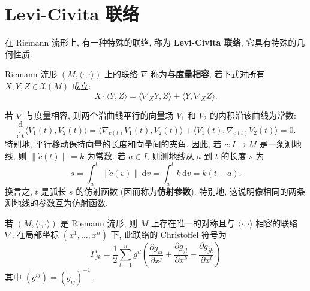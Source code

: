 \section{Levi-Civita 联络}\label{sec:levi-civita-connection}

在 Riemann 流形上, 有一种特殊的联络, 称为 \textbf{Levi-Civita 联络}, 它具有特殊的几何性质.

\begin{RiemannDefinition}\label{def:metric-compatible-connection}
Riemann 流形 $(M,\langle\cdot,\cdot\rangle)$ 上的联络 $\nabla$ 称为\textbf{与度量相容}, 若下式对所有 $X,Y,Z\in\mathfrak{X}(M)$ 成立:
\[
  X\cdot\langle Y,Z\rangle
  =\langle\nabla_XY,Z\rangle+\langle Y,\nabla_XZ\rangle.
\]
\end{RiemannDefinition}

若 $\nabla$ 与度量相容, 则两个沿曲线平行的向量场 $V_1$ 和 $V_2$ 的内积沿该曲线为常数:
\[
  \frac{\mathrm{d}}{\mathrm{d}t}\langle V_1(t),V_2(t)\rangle
  =\bigl\langle\nabla_{\dot c(t)}V_1(t),V_2(t)\bigr\rangle
   +\bigl\langle V_1(t),\nabla_{\dot c(t)}V_2(t)\bigr\rangle=0.
\]
特别地, 平行移动保持向量的长度和向量间的夹角. 因此, 若 $c:I\to M$ 是一条测地线, 则 $\lVert\dot c(t)\rVert=k$ 为常数. 若 $a\in I$, 则测地线从 $a$ 到 $t$ 的长度 $s$ 为
\[
  s=\int_a^t\lVert\dot c(v)\rVert\,\mathrm{d}v
   =\int_a^t k\,\mathrm{d}v=k(t-a).
\]
换言之, $t$ 是弧长 $s$ 的仿射函数 (因而称为\textbf{仿射参数}). 特别地, 这说明像相同的两条测地线的参数互为仿射函数.

\begin{RiemannTheorem}\label{thm:levi-civita-connection}
若 $(M,\langle\cdot,\cdot\rangle)$ 是 Riemann 流形, 则 $M$ 上存在唯一的对称且与 $\langle\cdot,\cdot\rangle$ 相容的联络 $\nabla$. 在局部坐标 $(x^1,\ldots,x^n)$ 下, 此联络的 Christoffel 符号为
\begin{equation}\label{eq:levi-civita-christoffel-symbols}
  \Gamma^i_{jk}=\frac12\sum_{l=1}^n g^{il}
  \left(\frac{\partial g_{kl}}{\partial x^j}
       +\frac{\partial g_{jl}}{\partial x^k}
       -\frac{\partial g_{jk}}{\partial x^l}\right)
\end{equation}
其中 $(g^{ij})=(g_{ij})^{-1}$.
\end{RiemannTheorem}


